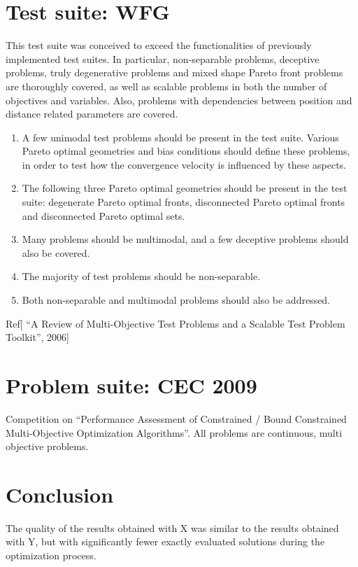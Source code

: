 \section{Test suite: WFG}
This test suite was conceived to exceed the functionalities of previously implemented test suites.
In particular, non-separable problems, deceptive problems, truly degenerative problems and mixed shape Pareto front problems are thoroughly covered, 
as well as scalable problems in both the number of objectives and variables. Also, problems with dependencies between position and distance related parameters are covered.
    \begin{enumerate}

        \item A few unimodal test problems should be present in the test suite. 
        Various Pareto optimal geometries and bias conditions should define these problems, 
        in order to test how the convergence velocity is influenced by these aspects.

        \item The following three Pareto optimal geometries should be present in the test suite: 
        degenerate Pareto optimal fronts, disconnected Pareto optimal fronts and disconnected Pareto optimal sets.

        \item Many problems should be multimodal, and a few deceptive problems should also be covered.
        \item The majority of test problems should be non-separable.
        \item Both non-separable and multimodal problems should also be addressed.
    \end{enumerate}
Ref[ “A Review of Multi-Objective Test Problems and a Scalable Test Problem Toolkit”, 2006]

\section{Problem suite: CEC 2009}
Competition on “Performance Assessment of Constrained / Bound Constrained Multi-Objective Optimization Algorithms”. All problems are continuous, multi objective problems.


\section{Conclusion}

The quality of the results obtained with X was similar to the results obtained with Y,
 but with significantly fewer exactly evaluated solutions during the optimization process. 


